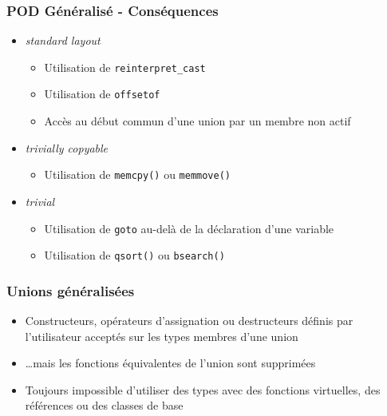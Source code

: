 \documentclass[C++.tex]{subfiles}
\begin{document}
\begin{frame}[fragile]
	\frametitle{POD Généralisé - Conséquences}
	\begin{itemize}
		\item \textit{standard layout}
		\begin{itemize}
			\item Utilisation de \lstinline|reinterpret_cast|
			\item Utilisation de \lstinline|offsetof|
			\item Accès au début commun d'une union par un membre non actif
		\end{itemize}
	
		\item \textit{trivially copyable}
		\begin{itemize}
			\item Utilisation de \lstinline|memcpy()| ou \lstinline|memmove()|
		\end{itemize}

		\item \textit{trivial}
		\begin{itemize}
			\item Utilisation de \lstinline|goto| au-delà de la déclaration d'une variable
			\item Utilisation de \lstinline|qsort()| ou \lstinline|bsearch()|
		\end{itemize}
	\end{itemize}
\end{frame}

\begin{frame}[fragile]
	\frametitle{Unions généralisées}
	\begin{itemize}
		\item Constructeurs, opérateurs d'assignation ou destructeurs définis par l'utilisateur acceptés sur les types membres d'une union
		\item \ldots mais les fonctions équivalentes de l'union sont supprimées


		\item Toujours impossible d'utiliser des types avec des fonctions virtuelles, des références ou des classes de base
	\end{itemize}
\end{frame}
\end{document}

